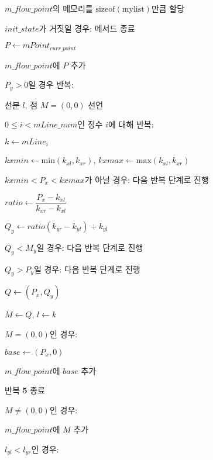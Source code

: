 \begin{algorithm}
	\item $m\_flow\_point$의 메모리를 $\mathrm{sizeof}\left(\mathrm{mylist}\right)$만큼 할당
	\item $init\_state$가 거짓일 경우: 메서드 종료
	\item $P \leftarrow mPoint_{curr\_point}$
	\item $m\_flow\_point$에 $P$ 추가
	\item $P_y > 0$일 경우 반복:
	\begin{algorithm}
		\item 선분 $l$, 점 $M = \left(0, 0\right)$ 선언
		\item $0 \leq i < mLine\_num$인 정수 $i$에 대해 반복:
		\begin{algorithm}
			\item $k \leftarrow mLine_i$
			\item $kxmin \leftarrow \mathrm{min}\left(k_{xl}, k_{xr}\right)$, $kxmax \leftarrow \mathrm{max}\left(k_{xl}, k_{xr}\right)$
			\item $kxmin < P_x < kxmax$가 아닐 경우: 다음 반복 단계로 진행
			\item $ratio \leftarrow \dfrac{P_x - k_{xl}}{k_{xr} - k_{xl}}$
			\item $Q_y \leftarrow ratio \left(k_{yr} - k_{yl}\right) + k_{yl}$
			\item $Q_y < M_y$일 경우: 다음 반복 단계로 진행
			\item $Q_y > P_y$일 경우: 다음 반복 단계로 진행
			\item $Q \leftarrow \left(P_x, Q_y\right)$
			\item $M \leftarrow Q$, $l \leftarrow k$
		\end{algorithm}
		\item $M = \left(0, 0\right)$인 경우:
		\begin{algorithm}
			\item $base \leftarrow \left(P_x, 0\right)$
			\item $m\_flow\_point$에 $base$ 추가
			\item 반복 \textbf{5} 종료
		\end{algorithm}
		\item $M \neq \left(0, 0\right)$인 경우:
		\begin{algorithm}
			\item $m\_flow\_point$에 $M$ 추가
		\end{algorithm} 
		\item $l_{yl} < l_{yr}$인 경우:
		\begin{algorithm}

\end{algorithm}
\end{algorithm}
\end{algorithm}
